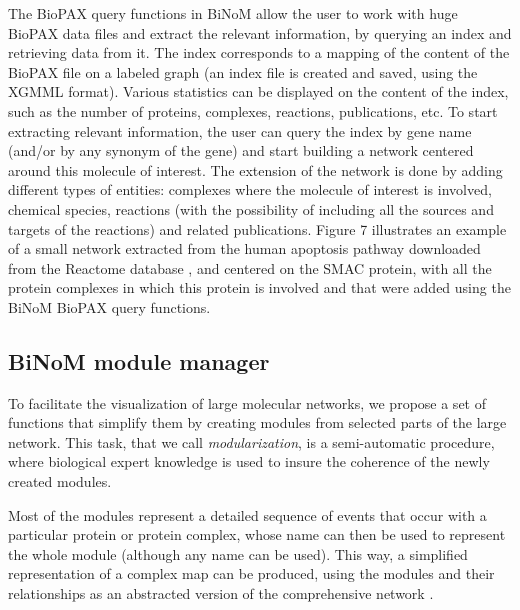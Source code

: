 \documentclass[10pt]{bmc_article}
\newenvironment{bmcformat}{\baselineskip20pt\sloppy\setboolean{publ}{false}}{\baselineskip20pt\sloppy}
\begin{document}
\begin{bmcformat}
The BioPAX query functions in BiNoM allow the user to work with huge
BioPAX data files and extract the relevant information, by querying an index and
retrieving data from it. The index corresponds to a mapping of the content of
the BioPAX file on a labeled graph (an index file is created and saved, using
the XGMML format). Various statistics can be displayed on the content of the
index, such as the number of proteins, complexes, reactions, publications, etc.
To start extracting relevant information, the user can query the index by gene
name (and/or by any synonym of the gene) and start building a network centered
around this molecule of interest. The extension of the network is done by adding
different types of entities: complexes where the molecule of interest is
involved, chemical species, reactions (with the possibility of including all the
sources and targets of the reactions) and related publications. Figure 7
illustrates an example of a small network extracted from the human apoptosis
pathway downloaded from the Reactome database \cite{joshi2005reactome}, and
centered on the SMAC protein, with all the protein complexes in which
this protein is involved and that were added using the BiNoM BioPAX query functions.


\subsection*{BiNoM module manager}

To facilitate the visualization of large molecular networks, we propose a set of
functions that simplify them by creating modules from selected parts of the
large network. This task, that we call \emph{modularization}, is a
semi-automatic procedure, where biological expert knowledge is used to insure
the coherence of the newly created modules.

Most of the modules represent a detailed
sequence of events that occur with a particular protein or protein complex,
whose name can then be used to represent the whole module (although any name can be used). This way, a
simplified representation of a complex map can be produced, using the modules
and their relationships as an abstracted version of the comprehensive network
\cite{calzone2008comprehensive}.


\end{bmcformat}
\end{document}

